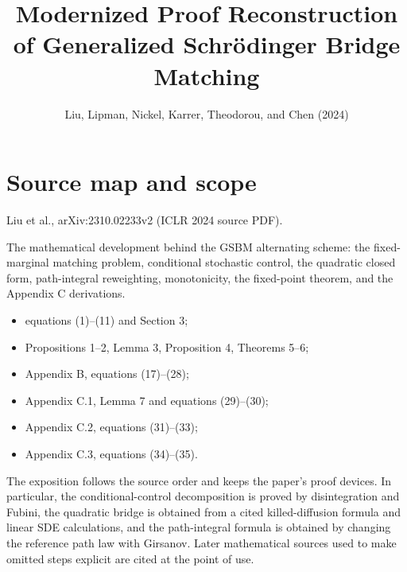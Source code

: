 
\title{Modernized Proof Reconstruction of Generalized Schr\"odinger Bridge Matching}
\author{}
\date{Liu, Lipman, Nickel, Karrer, Theodorou, and Chen (2024)}

\maketitle

\section*{Source map and scope}
\begin{sourceguide}
\item[Primary source] Liu et al., arXiv:2310.02233v2 (ICLR 2024 source PDF).
\item[Coverage] The mathematical development behind the GSBM alternating scheme: the fixed-marginal matching problem, conditional stochastic control, the quadratic closed form, path-integral reweighting, monotonicity, the fixed-point theorem, and the Appendix C derivations.
\item[Source anchors]
\begin{itemize}[leftmargin=2em]
  \item equations (1)--(11) and Section 3;
  \item Propositions 1--2, Lemma 3, Proposition 4, Theorems 5--6;
  \item Appendix B, equations (17)--(28);
  \item Appendix C.1, Lemma 7 and equations (29)--(30);
  \item Appendix C.2, equations (31)--(33);
  \item Appendix C.3, equations (34)--(35).
\end{itemize}
\end{sourceguide}

The exposition follows the source order and keeps the paper's proof devices.  In
particular, the conditional-control decomposition is proved by disintegration and
Fubini, the quadratic bridge is obtained from a cited killed-diffusion formula and
linear SDE calculations, and the path-integral formula is obtained by changing the
reference path law with Girsanov.  Later mathematical sources used to make omitted
steps explicit are cited at the point of use.

